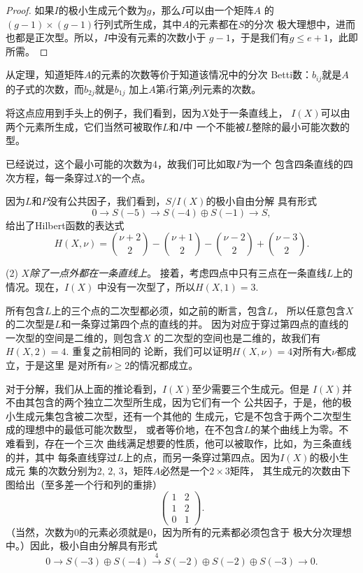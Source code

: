 \begin{proof}
如果$I$的极小生成元个数为$g$，那么$I$可以由一个矩阵$A$
的$(g-1)\times (g-1)$行列式所生成，其中$A$的元素都在$S$的分次
极大理想中，进而也都是正次型。所以，$I$中没有元素的次数小于
$g-1$，于是我们有$g\leq e+1$，此即所需。
\end{proof}

从定理，知道矩阵$A$的元素的次数等价于知道该情况中的分次
Betti数：$b_{ij}$就是$A$的子式的次数，而$b_{2j}$就是$b_{1j}$
加上$A$第$i$行第$j$列元素的次数。

将这点应用到手头上的例子，我们看到，因为$X$处于一条直线上，
$I(X)$可以由两个元素所生成，它们当然可被取作$L$和$I$中
一个不能被$L$整除的最小可能次数的型。


已经说过，这个最小可能的次数为$4$，故我们可比如取$F$为一个
包含四条直线的四次方程，每一条穿过$X$的一个点。

因为$L$和$P$没有公共因子，我们看到，$S/I(X)$的极小自由分解
具有形式
\[
	0\longrightarrow S(-5)\longrightarrow S(-4)\oplus
	S(-1)\longrightarrow S,
\]
给出了Hilbert函数的表达式
\[
	H(X,\nu)=\binom{\nu+2}{2}-\binom{\nu+1}{2}
	-\binom{\nu-2}{2}+\binom{\nu-3}{2}.
\]

(2) \textit{$X$除了一点外都在一条直线上}。
接着，考虑四点中只有三点在一条直线$L$上的情况。现在，$I(X)$
中没有一次型了，所以$H(X,1)=3$.


所有包含$L$上的三个点的二次型都必须，如之前的断言，包含$L$，
所以任意包含$X$的二次型是$L$和一条穿过第四个点的直线的并。
因为对应于穿过第四点的直线的一次型的空间是二维的，则包含$X$
的二次型的空间也是二维的，故我们有$H(X,2)=4$. 重复之前相同的
论断，我们可以证明$H(X,\nu)=4$对所有大$\nu$都成立，于是这里
是对所有$\nu\geq 2$的情况都成立。


对于分解，我们从上面的推论看到，$I(X)$至少需要三个生成元。但是
$I(X)$并不由其包含的两个独立二次型所生成，因为它们有一个
公共因子，于是，他的极小生成元集包含被二次型，还有一个其他的
生成元，它是不包含于两个二次型生成的理想中的最低可能次数型，
或者等价地，在不包含$L$的某个曲线上为零。不难看到，存在一个三次
曲线满足想要的性质，他可以被取作，比如，为三条直线的并，其中
每条直线穿过$L$上的点，而另一条穿过第四点。因为$I(X)$的极小生成元
集的次数分别为$2$, $2$, $3$，矩阵$A$必然是一个$2\times 3$矩阵，
其生成元的次数由下图给出（至多差一个行和列的重排）
\[
	\begin{pmatrix}
	1&2\\
	1&2\\
	0&1
	\end{pmatrix}.
\]
（当然，次数为$0$的元素必须就是$0$，因为所有的元素都必须包含于
极大分次理想中。）因此，极小自由分解具有形式
\[
	0\longrightarrow S(-3)\oplus S(-4)\xrightarrow{4}
	S(-2)\oplus S(-2)\oplus S(-3)\longrightarrow 0.
\]

